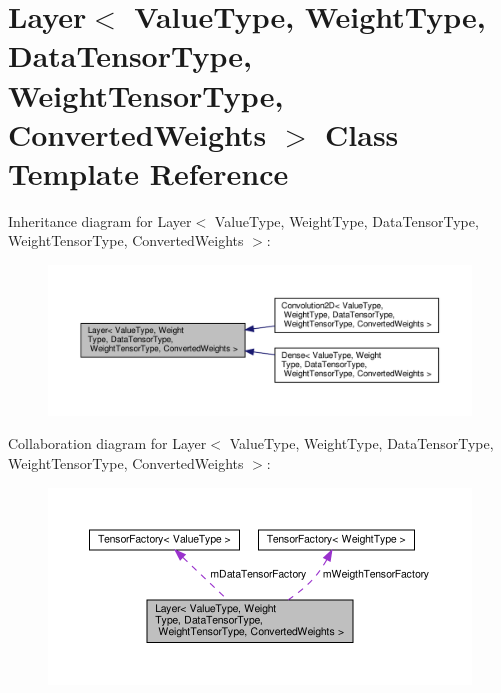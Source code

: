 \hypertarget{classLayer}{}\section{Layer$<$ Value\+Type, Weight\+Type, Data\+Tensor\+Type, Weight\+Tensor\+Type, Converted\+Weights $>$ Class Template Reference}
\label{classLayer}


Inheritance diagram for Layer$<$ Value\+Type, Weight\+Type, Data\+Tensor\+Type, Weight\+Tensor\+Type, Converted\+Weights $>$\+:
\nopagebreak
\begin{figure}[H]
\begin{center}
\leavevmode
\includegraphics[width=350pt]{classLayer__inherit__graph}
\end{center}
\end{figure}


Collaboration diagram for Layer$<$ Value\+Type, Weight\+Type, Data\+Tensor\+Type, Weight\+Tensor\+Type, Converted\+Weights $>$\+:
\nopagebreak
\begin{figure}[H]
\begin{center}
\leavevmode
\includegraphics[width=350pt]{classLayer__coll__graph}
\end{center}
\end{figure}
